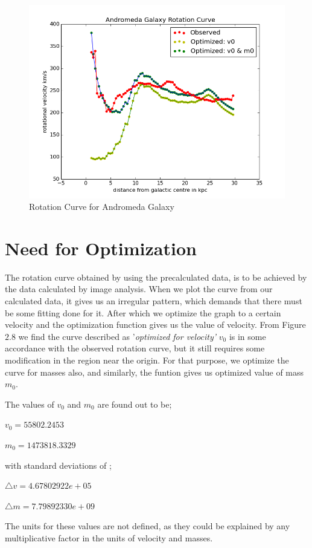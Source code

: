 \begin{figure} [h]
\centering
\includegraphics[scale=0.5]{best}
\caption{Rotation Curve for Andromeda Galaxy}
\end{figure}

\section{Need for Optimization}

The rotation curve obtained by using the precalculated data, is to be achieved by the data calculated by image analysis. When we plot the curve from our calculated data, it gives us an irregular pattern, which demands that there must be some fitting done for it. After which we optimize the graph to a certain velocity and the optimization function gives us the value of velocity. From Figure $2.8$ we find the curve described as '\textit{optimized for velocity'} \textbf{$v_{0}$} is in some accordance with the observed rotation curve, but it still requires some modification in the region near the origin. For that purpose, we optimize the curve for masses also, and similarly, the funtion gives us optimized value of mass \textbf{$m_{0}$}. 

The values of $v_{0}$ and $m_{0}$ are found out to be;

$v_{0} = 55802.2453 $         

$m_{0} = 1473818.3329 $

with standard deviations of ;

$\triangle v =  4.67802922e+05$

$\triangle m = 7.79892330e+09 $

The units for these values are not defined, as they could be explained by any multiplicative factor in the units of velocity and masses. 